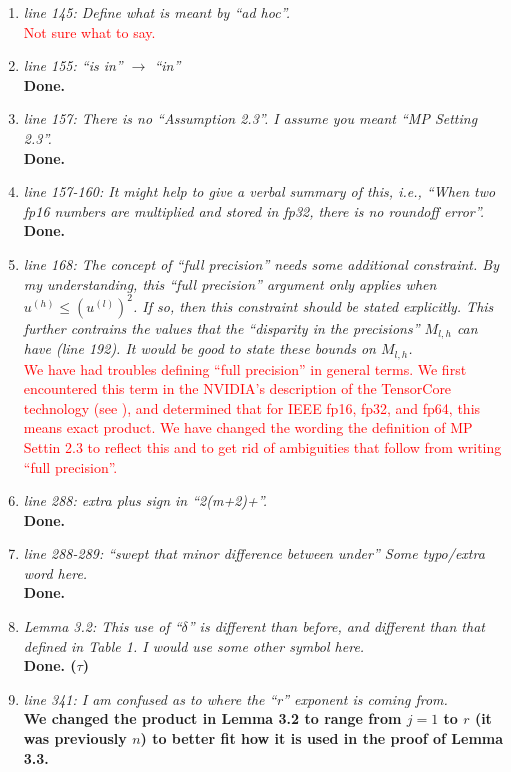 \documentclass[final,onefignum,onetabnum]{siamart190516}
\newcommand{\red}[1]{\textcolor{red}{#1}}
\begin{document}
\begin{enumerate}
    {\bf Done.}
    \item {\it line 145: Define what is meant by ``ad hoc''. }\\
    \red{Not sure what to say.}
    \item {\it line 155: ``is in'' $\rightarrow $ ``in'' }\\
    {\bf Done.}
    \item {\it line 157: There is no ``Assumption 2.3''. I assume you meant ``MP Setting 2.3''. }\\
    {\bf Done.}
    \item {\it line 157-160: It might help to give a verbal summary of this, i.e., ``When two fp16 numbers are multiplied and stored in fp32, there is no roundoff error''. }\\
    {\bf Done.}
    \item {\it line 168: The concept of ``full precision'' needs some additional constraint. By my understanding, this ``full precision'' argument only applies when $u^{(h)} \leq (u^{(l)})^2$. If so, then this constraint should be stated explicitly. This further contrains the values that the ``disparity in the precisions'' $M_{l,h}$ can have (line 192). It would be good to state these bounds on $M_{l,h}$. }\\
    \red{We have had troubles defining ``full precision'' in general terms. We first encountered this term in the NVIDIA's description of the TensorCore technology (see \cite{Nvidia2017}), and determined that for IEEE fp16, fp32, and fp64, this means exact product. We have changed the wording the definition of MP Settin 2.3 to reflect this and to get rid of ambiguities that follow from writing ``full precision''.}
    \item {\it line 288: extra plus sign in ``2(m+2)+''. }\\
    {\bf Done.}
    \item {\it line 288-289: ``swept that minor difference between under'' Some typo/extra word here. }\\
    {\bf Done.}
    \item {\it Lemma 3.2: This use of ``$\delta$'' is different than before, and different than that defined in Table 1. I would use some other symbol here. }\\
    {\bf Done. ($\tau$)}
    \item {\it line 341: I am confused as to where the ``r'' exponent is coming from. }\\
    {\bf We changed the product in Lemma 3.2 to range from $j=1$ to $r$ (it was previously $n$) to better fit how it is used in the proof of Lemma 3.3. }

\end{enumerate}
\end{document}
